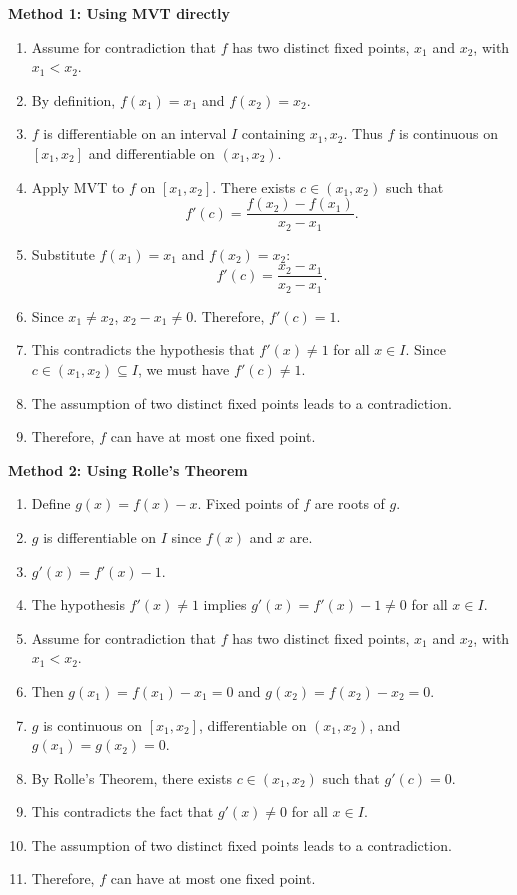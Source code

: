 \documentclass{article}
\begin{document}
\textbf{Method 1: Using MVT directly}
\begin{enumerate}
    \item Assume for contradiction that \(f\) has two distinct fixed points, \(x_1\) and \(x_2\), with \(x_1 < x_2\).
    \item By definition, \(f(x_1) = x_1\) and \(f(x_2) = x_2\).
    \item \(f\) is differentiable on an interval \(I\) containing \(x_1, x_2\). Thus \(f\) is continuous on \([x_1, x_2]\) and differentiable on \((x_1, x_2)\).
    \item Apply MVT to \(f\) on \([x_1, x_2]\). There exists \(c \in (x_1, x_2)\) such that
    \[ f'(c) = \frac{f(x_2) - f(x_1)}{x_2 - x_1}. \]
    \item Substitute \(f(x_1) = x_1\) and \(f(x_2) = x_2\):
    \[ f'(c) = \frac{x_2 - x_1}{x_2 - x_1}. \]
    \item Since \(x_1 \ne x_2\), \(x_2 - x_1 \ne 0\). Therefore, \(f'(c) = 1\).
    \item This contradicts the hypothesis that \(f'(x) \ne 1\) for all \(x \in I\). Since \(c \in (x_1, x_2) \subseteq I\), we must have \(f'(c) \ne 1\).
    \item The assumption of two distinct fixed points leads to a contradiction.
    \item Therefore, \(f\) can have at most one fixed point.
\end{enumerate}

\textbf{Method 2: Using Rolle's Theorem}
\begin{enumerate}
    \item Define \(g(x) = f(x) - x\). Fixed points of \(f\) are roots of \(g\).
    \item \(g\) is differentiable on \(I\) since \(f(x)\) and \(x\) are.
    \item \(g'(x) = f'(x) - 1\).
    \item The hypothesis \(f'(x) \ne 1\) implies \(g'(x) = f'(x) - 1 \ne 0\) for all \(x \in I\).
    \item Assume for contradiction that \(f\) has two distinct fixed points, \(x_1\) and \(x_2\), with \(x_1 < x_2\).
    \item Then \(g(x_1) = f(x_1) - x_1 = 0\) and \(g(x_2) = f(x_2) - x_2 = 0\).
    \item \(g\) is continuous on \([x_1, x_2]\), differentiable on \((x_1, x_2)\), and \(g(x_1) = g(x_2) = 0\).
    \item By Rolle's Theorem, there exists \(c \in (x_1, x_2)\) such that \(g'(c) = 0\).
    \item This contradicts the fact that \(g'(x) \ne 0\) for all \(x \in I\).
    \item The assumption of two distinct fixed points leads to a contradiction.
    \item Therefore, \(f\) can have at most one fixed point.
\end{enumerate}
\end{document}
